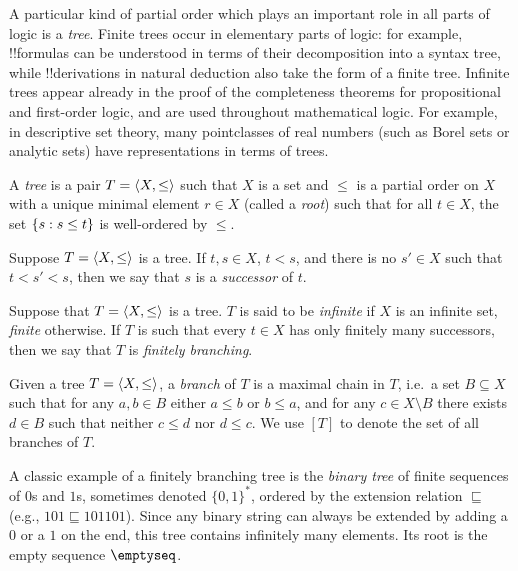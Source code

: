 \documentclass[../../../include/open-logic-section]{subfiles}
\begin{document}

A particular kind of partial order which plays an important role in
all parts of logic is a \emph{tree}. Finite trees occur in elementary
parts of logic: for example, !!{formula}s can be understood in terms
of their decomposition into a syntax tree, while !!{derivation}s in
natural deduction also take the form of a finite tree.
%
Infinite trees appear already in the proof of the completeness
theorems for propositional and first-order logic, and are used
throughout mathematical logic. For example, in descriptive set theory,
many pointclasses of real numbers (such as Borel sets or analytic sets)
have representations in terms of trees.

\begin{defn}[Tree]
A \emph{tree} is a pair $T = \langle X,\le \rangle$ such that $X$ is a set
and $\le$ is a partial order on $X$ with a unique minimal element
$r \in X$ (called a \emph{root}) such that for all $t \in X$,
the set $\{ s : s \le t \}$ is well-ordered by $\le$.
\end{defn}

\begin{defn}[Successors]
Suppose $T = \langle X,\le \rangle$ is a tree.
%
If $t,s \in X$, $t < s$, and there is no $s' \in X$ such that
$t < s' < s$, then we say that $s$ is a \emph{successor} of $t$.
\end{defn}

\begin{defn}
Suppose that $T = \langle X,\le \rangle$ is a tree.
%
$T$ is said to be \emph{infinite} if $X$ is an infinite set,
\emph{finite} otherwise.
%
If $T$ is such that every $t \in X$ has only finitely many
successors, then we say that $T$ is \emph{finitely branching}.
\end{defn}

\begin{defn}[Branches]
Given a tree $T = \langle X,\le \rangle$, a \emph{branch} of $T$ is a
maximal chain in $T$, i.e.\ a set $B \subseteq X$ such that
for any $a,b \in B$ either $a \le b$ or $b \le a$, and for any
$c \in X \setminus B$ there exists $d \in B$ such that neither
$c \le d$ nor $d \le c$.
%
We use $[T]$ to denote the set of all branches of $T$.
\end{defn}

\begin{ex}
A classic example of a finitely branching tree is the
\emph{binary tree} of finite sequences of $0$s and $1$s,
sometimes denoted $\{0,1\}^*$, ordered by the extension
relation $\sqsubseteq$ (e.g., $101 \sqsubseteq 101101$).
Since any binary string can always be extended by adding
a $0$ or a $1$ on the end, this tree contains infinitely
many elements. Its root is the empty sequence $\emptyseq$.
\end{ex}
\end{document}
